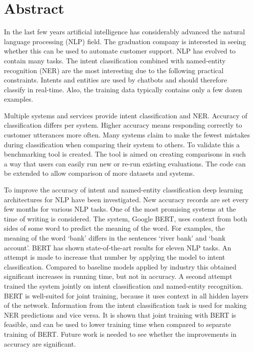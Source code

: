 \chapter*{Abstract}
\label{ch:abstract}

In the last few years artificial intelligence has considerably advanced the natural language processing (NLP) field.
The graduation company is interested in seeing whether this can be used to automate customer support.
NLP has evolved to contain many tasks.
The intent classification combined with named-entity recognition (NER) are the most interesting due to the following practical constraints.
Intents and entities are used by chatbots and should therefore classify in real-time.
Also, the training data typically contains only a few dozen examples.

Multiple systems and services provide intent classification and NER.
Accuracy of classification differs per system.
Higher accuracy means responding correctly to customer utterances more often.
Many systems claim to make the fewest mistakes during classification when comparing their system to others.
To validate this a benchmarking tool is created.
The tool is aimed on creating comparisons in such a way that users can easily run new or re-run existing evaluations.
The code can be extended to allow comparison of more datasets and systems.

To improve the accuracy of intent and named-entity classification deep learning architectures for NLP have been investigated.
New accuracy records are set every few months for various NLP tasks.
One of the most promising systems at the time of writing is considered.
The system, Google BERT, uses context from both sides of some word to predict the meaning of the word.
For examples, the meaning of the word `bank' differs in the sentences `river bank' and `bank account'.
BERT has shown state-of-the-art results for eleven NLP tasks.
An attempt is made to increase that number by applying the model to intent classification.
Compared to baseline models applied by industry this obtained significant increases in running time, but not in accuracy.
A second attempt trained the system jointly on intent classification and named-entity recognition.
BERT is well-suited for joint training, because it uses context in all hidden layers of the network.
Information from the intent classification task is used for making NER predictions and vice versa.
It is shown that joint training with BERT is feasible, and can be used to lower training time when compared to separate training of BERT.
Future work is needed to see whether the improvements in accuracy are significant.
